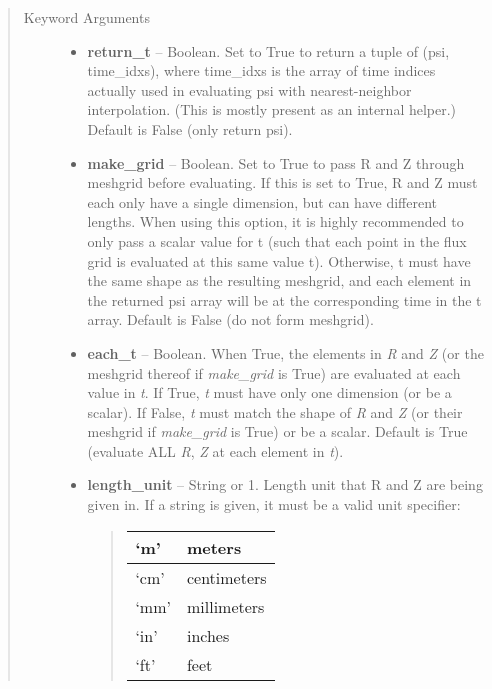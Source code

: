 \documentclass[letterpaper,10pt,english]{sphinxmanual}
\begin{document}
\begin{fulllineitems}
\begin{fulllineitems}
\begin{quote}
\begin{description}
\item[{Keyword Arguments}] \leavevmode\begin{itemize}
\item {} 
\textbf{return\_t} --
Boolean.
Set to True to return a tuple of (psi, time\_idxs),
where time\_idxs is the array of time indices actually used in
evaluating psi with nearest-neighbor interpolation. (This is
mostly present as an internal helper.) Default is False (only
return psi).

\item {} 
\textbf{make\_grid} --
Boolean.
Set to True to pass R and Z through meshgrid
before evaluating. If this is set to True, R and Z must each
only have a single dimension, but can have different lengths.
When using this option, it is highly recommended to only pass
a scalar value for t (such that each point in the flux grid is
evaluated at this same value t). Otherwise, t must have the
same shape as the resulting meshgrid, and each element in the
returned psi array will be at the corresponding time in the t
array. Default is False (do not form meshgrid).

\item {} 
\textbf{each\_t} --
Boolean.
When True, the elements in \emph{R} and \emph{Z} (or the meshgrid thereof
if \emph{make\_grid} is True) are evaluated at each value in \emph{t}. If
True, \emph{t} must have only one dimension (or be a scalar). If
False, \emph{t} must match the shape of \emph{R} and \emph{Z} (or their
meshgrid if \emph{make\_grid} is True) or be a scalar. Default is True
(evaluate ALL \emph{R}, \emph{Z} at each element in \emph{t}).

\item {} 
\textbf{length\_unit} --
String or 1.
Length unit that R and Z are being given
in. If a string is given, it must be a valid unit specifier:
\begin{quote}

\begin{tabulary}{\linewidth}{|L|L|}
\hline

`m'
 & 
meters
\\\hline

`cm'
 & 
centimeters
\\\hline

`mm'
 & 
millimeters
\\\hline

`in'
 & 
inches
\\\hline

`ft'
 & 
feet
\\\hline


\end{tabulary}
\end{quote}
\end{itemize}
\end{description}
\end{quote}
\end{fulllineitems}
\end{fulllineitems}
\end{document}
